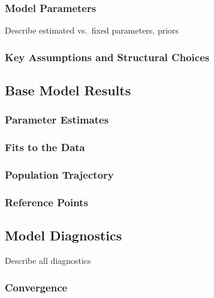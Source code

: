 \documentclass[11pt,
  english,
  letterpaper,
]{article}
\begin{document}
\hypertarget{model-parameters}{%
\subsubsection{Model Parameters}\label{model-parameters}}

Describe estimated vs.~fixed parameters, priors

\hypertarget{key-assumptions-and-structural-choices}{%
\subsubsection{Key Assumptions and Structural Choices}\label{key-assumptions-and-structural-choices}}

\hypertarget{base-model-results}{%
\subsection{Base Model Results}\label{base-model-results}}

\hypertarget{parameter-estimates}{%
\subsubsection{Parameter Estimates}\label{parameter-estimates}}

\hypertarget{fits-to-the-data}{%
\subsubsection{Fits to the Data}\label{fits-to-the-data}}

\hypertarget{population-trajectory}{%
\subsubsection{Population Trajectory}\label{population-trajectory}}

\hypertarget{reference-points-1}{%
\subsubsection{Reference Points}\label{reference-points-1}}

\hypertarget{model-diagnostics}{%
\subsection{Model Diagnostics}\label{model-diagnostics}}

Describe all diagnostics

\hypertarget{convergence}{%
\subsubsection{Convergence}\label{convergence}}
\end{document}

